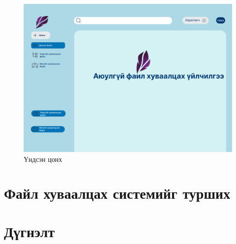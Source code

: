 \begin{figure}[ht]
    \centering
    \includegraphics[scale=0.3]{Figures/Main.png}
    \caption[Usecase diagram]{Үндсэн цонх}
    \label{fig:home}
\end{figure}

\section{Файл хуваалцах системийг турших}


\section{Дүгнэлт}

